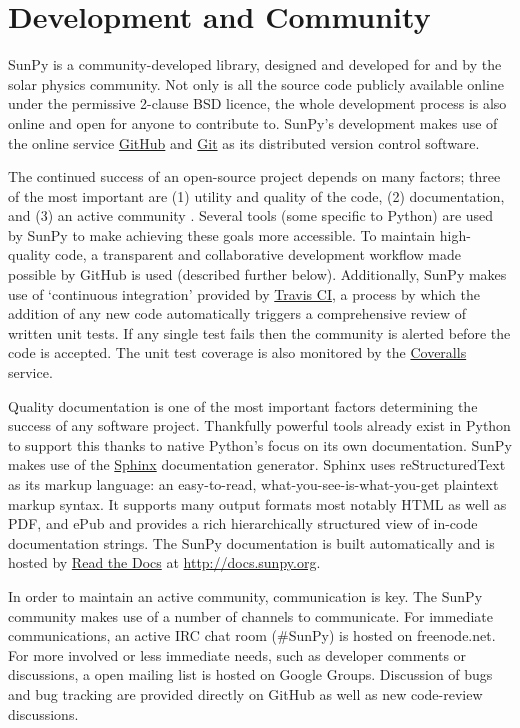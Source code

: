 \section{Development and Community}\label{sec:dev}
SunPy is a community-developed library, designed and developed for and by 
the solar physics community. Not only is all the source code publicly available 
online under the permissive 2-clause BSD licence, the whole 
development process is also online and open for anyone to contribute to.
SunPy's development makes use of the online service 
\href{http://github.com}{GitHub} and \href{http://git-scm.com/}{Git}
as its distributed version control software. 

The continued success of an open-source project depends on many factors;
three of the most important are (1) utility and quality of the code, (2) documentation, and (3) an
active community \citep{bangerth2013}. Several tools (some specific to Python) are used by
SunPy to make achieving these goals more accessible. To maintain high-quality code, a 
transparent and collaborative development workflow made possible by GitHub is used (described
further below).
Additionally, SunPy makes use of `continuous integration' provided by
\href{http://travis-ci.org}{Travis CI}, a process by which the addition of any new code 
automatically triggers a comprehensive review of written unit tests. If any single test
fails then the community is alerted before the code is accepted. The unit test coverage is
also monitored by the \href{http://coveralls.io}{Coveralls} service.

Quality documentation is
one of the most important factors determining the success of any software project. 
Thankfully powerful tools already exist in Python to support this thanks to native
Python's focus on its own documentation. SunPy makes use of the \href{http://sphinx-doc.org}{Sphinx}
documentation generator. Sphinx uses reStructuredText as its markup language: 
an easy-to-read, what-you-see-is-what-you-get plaintext markup syntax. It supports
many output formats most notably HTML as well as PDF, and ePub and provides a rich
hierarchically structured view of in-code documentation strings. The SunPy documentation 
is built automatically and is hosted by \href{http://readthedocs.org}{Read the 
Docs} at \url{http://docs.sunpy.org}. 

In order to maintain an active community, communication is key.  The SunPy community makes
use of a number of channels to communicate. For immediate communications, an active IRC chat
room (\#SunPy) is hosted on freenode.net. For more involved or less immediate needs, such as
developer comments or discussions, a open mailing list is hosted on Google Groups. 
Discussion of bugs and bug tracking are provided directly on GitHub as well as new
code-review discussions.

